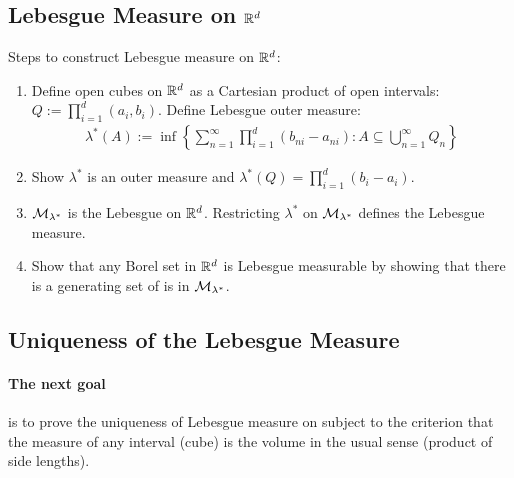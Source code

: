 \documentclass[11pt]{article}
\begin{document}
	\subsection{Lebesgue Measure on $\mathbb{R}^d$}
	\begin{definition}
		Steps to construct Lebesgue measure on $\mathbb{R}^d$:
		\begin{enumerate}
			\item Define open cubes on $\mathbb{R}^d$ as a Cartesian product of open intervals: $Q := \prod_{i=1}^d (a_i, b_i)$. Define Lebesgue outer measure:
			\begin{align}
				\lambda^*(A) := \inf \left\{ \sum_{n=1}^\infty \prod_{i=1}^d (b_{ni} - a_{ni}) : A \subseteq \bigcup_{n=1}^\infty Q_n \right\}
			\end{align}
			\item Show $\lambda^*$ is an outer measure and $\lambda^*(Q) = \prod_{i=1}^d (b_{i} - a_{i})$.
			\item $\mathcal{{M}}_{\lambda^*}$ is the Lebesgue \salg on $\mathbb{R}^d$. Restricting $\lambda^*$ on $\mathcal{{M}}_{\lambda^*}$ defines the Lebesgue measure.
			\item Show that any Borel set in $\mathbb{R}^d$ is Lebesgue measurable by showing that there is a generating set of \brd is in $\mathcal{{M}}_{\lambda^*}$.
		\end{enumerate}
	\end{definition}
	
	\subsection{Uniqueness of the Lebesgue Measure}
	\paragraph{The next goal} is to prove the uniqueness of Lebesgue measure on \brd subject to the criterion that the measure of any interval (cube) is the volume in the usual sense (product of side lengths).
\end{document}
